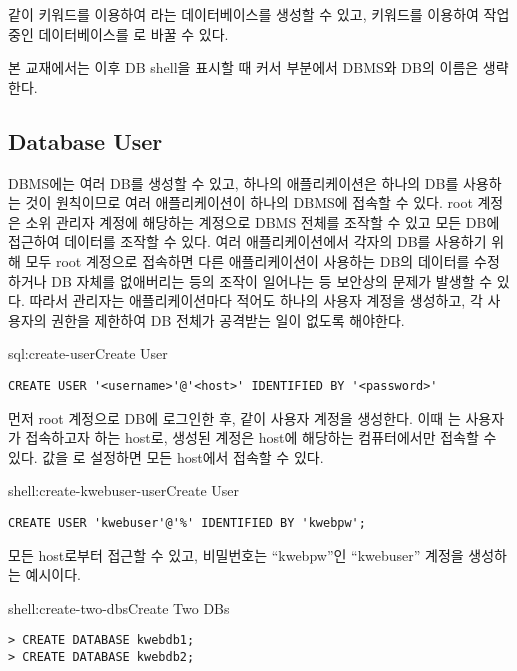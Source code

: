 \와 같이  키워드를 이용하여 라는 데이터베이스를 생성할 수 있고,  키워드를 이용하여 작업 중인 데이터베이스를 로 바꿀 수 있다.

본 교재에서는 이후 DB shell을 표시할 때 커서 부분에서 DBMS와 DB의 이름은 생략한다.

\subsection*{Database User}

DBMS에는 여러 DB를 생성할 수 있고, 하나의 애플리케이션은 하나의 DB를 사용하는 것이 원칙이므로 여러 애플리케이션이 하나의 DBMS에 접속할 수 있다. root 계정은 소위 관리자 계정에 해당하는 계정으로 DBMS 전체를 조작할 수 있고 모든 DB에 접근하여 데이터를 조작할 수 있다. 여러 애플리케이션에서 각자의 DB를 사용하기 위해 모두 root 계정으로 접속하면 다른 애플리케이션이 사용하는 DB의 데이터를 수정하거나 DB 자체를 없애버리는 등의 조작이 일어나는 등 보안상의 문제가 발생할 수 있다. 따라서 관리자는 애플리케이션마다 적어도 하나의 사용자 계정을 생성하고, 각 사용자의 권한을 제한하여 DB 전체가 공격받는 일이 없도록 해야한다.

\begin{sqlenv}{sql:create-user}{Create User}\begin{verbatim}
CREATE USER '<username>'@'<host>' IDENTIFIED BY '<password>'
\end{verbatim}
\end{sqlenv}

먼저 root 계정으로 DB에 로그인한 후, \과 같이 사용자 계정을 생성한다. 이때 는 사용자가 접속하고자 하는 host로, 생성된 계정은 host에 해당하는 컴퓨터에서만 접속할 수 있다.  값을 \cd{\%}로 설정하면 모든 host에서 접속할 수 있다.

\begin{shellenv}{shell:create-kwebuser-user}{Create  User}\begin{verbatim}
CREATE USER 'kwebuser'@'%' IDENTIFIED BY 'kwebpw';
\end{verbatim}
\end{shellenv}

\는 모든 host로부터 접근할 수 있고, 비밀번호는 ``kwebpw''인 ``kwebuser'' 계정을 생성하는 예시이다.

\begin{shellenv}{shell:create-two-dbs}{Create Two DBs}\begin{verbatim}
> CREATE DATABASE kwebdb1;
> CREATE DATABASE kwebdb2;
\end{verbatim}
\end{shellenv}

